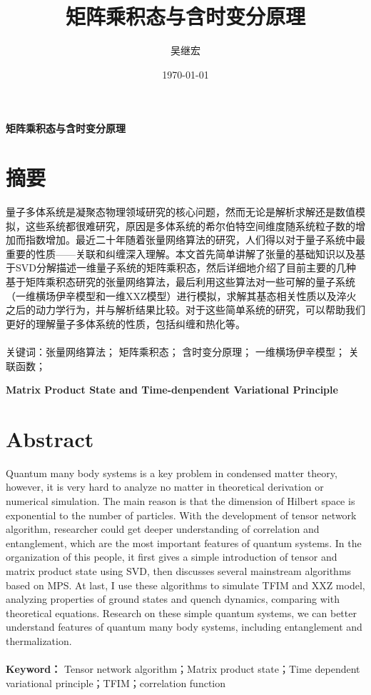 \documentclass[12pt]{article}
\title{\heiti 矩阵乘积态与含时变分原理}
\author{\kaishu 吴继宏 }
\date{\today}
\begin{document}
	
	\maketitle

	\newpage
	{\centering\tableofcontents}
	\newpage
	{\centering\textbf{矩阵乘积态与含时变分原理}}\\
	{\centering\section*{摘要}}
	量子多体系统是凝聚态物理领域研究的核心问题，然而无论是解析求解还是数值模拟，这些系统都很难研究，原因是多体系统的希尔伯特空间维度随系统粒子数的增加而指数增加。最近二十年随着张量网络算法的研究，人们得以对于量子系统中最重要的性质——关联和纠缠深入理解。本文首先简单讲解了张量的基础知识以及基于SVD分解描述一维量子系统的矩阵乘积态，然后详细地介绍了目前主要的几种基于矩阵乘积态研究的张量网络算法，最后利用这些算法对一些可解的量子系统（一维横场伊辛模型和一维XXZ模型）进行模拟，求解其基态相关性质以及淬火之后的动力学行为，并与解析结果比较。对于这些简单系统的研究，可以帮助我们更好的理解量子多体系统的性质，包括纠缠和热化等。\\~\\
	{\heiti 关键词：}张量网络算法； 矩阵乘积态； 含时变分原理； 一维横场伊辛模型； 关联函数；
	
	\newpage
	{\centering \textbf{Matrix Product State and Time-denpendent Variational Principle}}
	{\centering\section*{Abstract}}
	Quantum many body systems is a key problem in condensed matter theory, however, it is very hard to analyze no matter in theoretical derivation or numerical simulation. The main reason is that the dimension of Hilbert space is exponential to the number of particles. With the development of tensor network algorithm, researcher could get deeper understanding of correlation and entanglement, which are the most important features of quantum systems. In the organization of this people, it first gives a simple introduction of tensor and matrix product state using SVD, then discusses several mainstream algorithms based on MPS. At last, I use these algorithms to simulate TFIM and XXZ model, analyzing properties of ground states and quench dynamics, comparing with theoretical equations. Research on these simple quantum systems, we can better understand features of quantum many body systems, including entanglement and thermalization.\\~\\
	\textbf{Keyword：} Tensor network algorithm；Matrix product state；Time dependent variational principle；TFIM；correlation function
	
\end{document}
